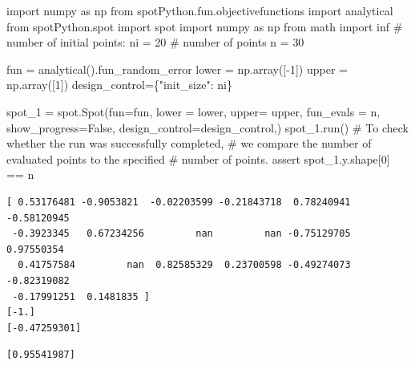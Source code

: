 \documentclass[
  letterpaper,
  DIV=11,
  numbers=noendperiod]{scrreprt}
\newenvironment{Shaded}{\begin{snugshade}}{\end{snugshade}}
\newcommand{\CommentTok}[1]{\textcolor[rgb]{0.37,0.37,0.37}{#1}}
\newcommand{\ControlFlowTok}[1]{\textcolor[rgb]{0.00,0.23,0.31}{#1}}
\newcommand{\DecValTok}[1]{\textcolor[rgb]{0.68,0.00,0.00}{#1}}
\newcommand{\ImportTok}[1]{\textcolor[rgb]{0.00,0.46,0.62}{#1}}
\newcommand{\NormalTok}[1]{\textcolor[rgb]{0.00,0.23,0.31}{#1}}
\newcommand{\OperatorTok}[1]{\textcolor[rgb]{0.37,0.37,0.37}{#1}}
\newcommand{\StringTok}[1]{\textcolor[rgb]{0.13,0.47,0.30}{#1}}
\newcommand{\VariableTok}[1]{\textcolor[rgb]{0.07,0.07,0.07}{#1}}
\begin{document}
\begin{Shaded}
\begin{Highlighting}[]
\ImportTok{import}\NormalTok{ numpy }\ImportTok{as}\NormalTok{ np}
\ImportTok{from}\NormalTok{ spotPython.fun.objectivefunctions }\ImportTok{import}\NormalTok{ analytical}
\ImportTok{from}\NormalTok{ spotPython.spot }\ImportTok{import}\NormalTok{ spot}
\ImportTok{import}\NormalTok{ numpy }\ImportTok{as}\NormalTok{ np}
\ImportTok{from}\NormalTok{ math }\ImportTok{import}\NormalTok{ inf}
\CommentTok{\# number of initial points:}
\NormalTok{ni }\OperatorTok{=} \DecValTok{20}
\CommentTok{\# number of points}
\NormalTok{n }\OperatorTok{=} \DecValTok{30}

\NormalTok{fun }\OperatorTok{=}\NormalTok{ analytical().fun\_random\_error}
\NormalTok{lower }\OperatorTok{=}\NormalTok{ np.array([}\OperatorTok{{-}}\DecValTok{1}\NormalTok{])}
\NormalTok{upper }\OperatorTok{=}\NormalTok{ np.array([}\DecValTok{1}\NormalTok{])}
\NormalTok{design\_control}\OperatorTok{=}\NormalTok{\{}\StringTok{"init\_size"}\NormalTok{: ni\}}

\NormalTok{spot\_1 }\OperatorTok{=}\NormalTok{ spot.Spot(fun}\OperatorTok{=}\NormalTok{fun,}
\NormalTok{            lower }\OperatorTok{=}\NormalTok{ lower,}
\NormalTok{            upper}\OperatorTok{=}\NormalTok{ upper,}
\NormalTok{            fun\_evals }\OperatorTok{=}\NormalTok{ n,}
\NormalTok{            show\_progress}\OperatorTok{=}\VariableTok{False}\NormalTok{,}
\NormalTok{            design\_control}\OperatorTok{=}\NormalTok{design\_control,)}
\NormalTok{spot\_1.run()}
\CommentTok{\# To check whether the run was successfully completed,}
\CommentTok{\# we compare the number of evaluated points to the specified}
\CommentTok{\# number of points.}
\ControlFlowTok{assert}\NormalTok{ spot\_1.y.shape[}\DecValTok{0}\NormalTok{] }\OperatorTok{==}\NormalTok{ n}
\end{Highlighting}
\end{Shaded}

\begin{verbatim}
[ 0.53176481 -0.9053821  -0.02203599 -0.21843718  0.78240941 -0.58120945
 -0.3923345   0.67234256         nan         nan -0.75129705  0.97550354
  0.41757584         nan  0.82585329  0.23700598 -0.49274073 -0.82319082
 -0.17991251  0.1481835 ]
[-1.]
[-0.47259301]
\end{verbatim}

\begin{verbatim}
[0.95541987]
\end{verbatim}
\end{document}
